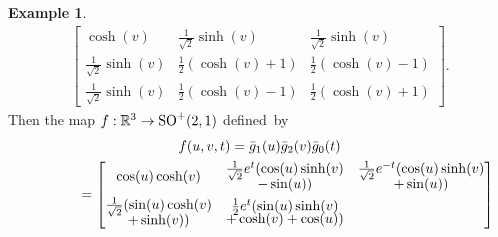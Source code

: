 \documentclass[pdftex]{sigma}
\numberwithin{equation}{section}
\theoremstyle{definition}
\newtheorem{exmpl}[teo]{Example}
\begin{document}
\begin{exmpl}
\begin{gather*}
\begin{bmatrix}
\cosh(v) & \frac{1}{\sqrt{2}}\sinh(v) & \frac{1}{\sqrt{2}}\sinh(v)
\\
\frac{1}{\sqrt{2}}\sinh(v) & \frac{1}{2}(\cosh(v) + 1) & \frac{1}{2}(\cosh(v) - 1)
\\
\frac{1}{\sqrt{2}}\sinh(v) & \frac{1}{2}(\cosh(v) - 1) & \frac{1}{2}(\cosh(v) + 1)
\end{bmatrix}.
\end{gather*}
Then the map $f: \mathbb{R}^3 \to {\rm SO}^+(2,1)$ def\/ined~by
\begin{gather*}
f(u,v,t) = \bar{g}_1(u) \bar{g}_2(v) \bar{g}_0(t)\\
\hphantom{f(u,v,t)}{} = \begin{bmatrix}
\cos(u) \cosh(v) & \begin{array}{@{}c@{}}\frac{1}{\sqrt{2}} e^t(\cos(u) \sinh(v)\vspace{-1mm}\\ -\sin(u))\end{array} &
\begin{array}{@{}c@{}}\frac{1}{\sqrt{2}} e^{-t}(\cos(u) \sinh(v)\vspace{-1mm}\\+\sin(u))\end{array}
\vspace{1mm}\\
\begin{array}{@{}c@{}}\frac{1}{\sqrt{2}}(\sin(u)\cosh(v)\vspace{-1mm}\\+\sinh(v))\end{array} &
\begin{array}{@{}c@{}}\frac{1}{2}e^t(\sin(u)\sinh(v)\vspace{-1mm}\\+\cosh(v)+\cos(u))\end{array} &

\end{bmatrix}
\end{gather*}
\end{exmpl}
\end{document}
